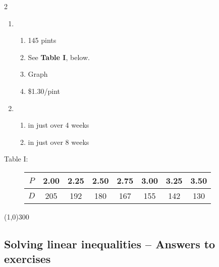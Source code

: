 \begin{multicols} {2}
\begin{enumerate}
\item %
\begin{enumerate}
\item 145 pints
\item See \textbf{Table I}, below.  
\item Graph
\item \$1.30/pint
\end{enumerate}

\item %
\begin{enumerate}
\item in just over 4 weeks
\item in just over 8 weeks
\end{enumerate}

\end{enumerate}
\end{multicols}

\bigskip
\begin{description}
\item[\quad Table I: \quad] 
\begin{tabular} {|c| |c|c |c|c |c|c |c|}\hline
$P$ & 2.00 & 2.25 & 2.50 & 2.75 & 3.00 & 3.25 & 3.50\\ \hline
$D$ & 205 & 192 & 180 & 167 & 155 & 142 & 130  \\ \hline
\end{tabular}
\end{description}
\bigskip

\begin{center}
\line(1,0){300} %
\end{center}

\subsection {Solving linear inequalities -- Answers to exercises} %

